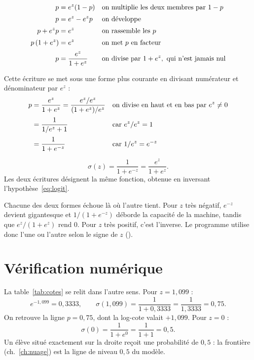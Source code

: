 \slidebreak

\begin{align}
  p &= e^{z}(1-p)
    &&\text{on multiplie les deux membres par } 1-p \notag\\[2pt]
  p &= e^{z}-e^{z}p
    &&\text{on développe} \notag\\[2pt]
  p+e^{z}p &= e^{z}
    &&\text{on rassemble les } p \notag\\[2pt]
  p\,(1+e^{z}) &= e^{z}
    &&\text{on met } p \text{ en facteur} \notag\\[2pt]
  p &= \frac{e^{z}}{1+e^{z}}
    &&\text{on divise par } 1+e^{z},\ \text{qui n'est jamais nul} \label{eq:sigma-brute}
\end{align}

Cette écriture se met sous une forme plus courante en divisant numérateur et
dénominateur par $e^{z}$ :
\begin{align}
  p &= \frac{e^{z}}{1+e^{z}}
     = \frac{e^{z}/e^{z}}{(1+e^{z})/e^{z}}
    &&\text{on divise en haut et en bas par } e^{z}\neq0 \notag\\[2pt]
    &= \frac{1}{1/e^{z}+1}
    &&\text{car } e^{z}/e^{z}=1 \notag\\[2pt]
    &= \frac{1}{1+e^{-z}}
    &&\text{car } 1/e^{z}=e^{-z} \label{eq:sigma}
\end{align}

\begin{resultat}
\[
  \sigma(z)=\frac{1}{1+e^{-z}}=\frac{e^{z}}{1+e^{z}} .
\]
Les deux écritures désignent la même fonction, obtenue en inversant
l'hypothèse~\eqref{eq:logit}.
\end{resultat}

Chacune des deux formes échoue là où l'autre tient. Pour $z$ très négatif,
$e^{-z}$ devient
gigantesque et $1/(1+e^{-z})$ déborde la capacité de la machine, tandis que
$e^{z}/(1+e^{z})$ rend $0$. Pour $z$ très positif, c'est
l'inverse. Le programme utilise donc l'une ou l'autre selon le signe de $z$
().

\section{Vérification numérique}

La table~\ref{tab:cotes} se relit dans l'autre sens. Pour $z=1{,}099$ :
\[
  e^{-1{,}099}=0{,}3333,\qquad
  \sigma(1{,}099)=\frac{1}{1+0{,}3333}=\frac{1}{1{,}3333}=0{,}75 .
\]
On retrouve la ligne $p=0{,}75$, dont la log-cote valait $+1{,}099$. Pour
$z=0$ :
\[
  \sigma(0)=\frac{1}{1+e^{0}}=\frac{1}{1+1}=0{,}5 .
\]
Un élève situé exactement sur la droite reçoit une probabilité de $0{,}5$ : la
frontière (ch.~\ref{ch:nuage}) est la ligne de niveau $0{,}5$ du modèle.

